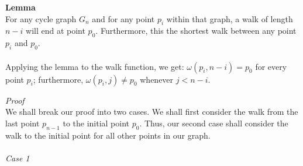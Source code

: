 \documentclass[a4paper,12pt]{article}
\begin{document}
\begin{tcolorbox}
\textbf{Lemma}\\
For any cycle graph $G_n$ and for any point $p_i$ within that graph, a walk of length $n - i$ will end at point $p_0$. Furthermore, this the shortest walk between any point $p_i$ and $p_0$.\\
\\
Applying the lemma to the walk function, we get: $\omega(p_i, n - i) = p_0$ for every point $p_i$; furthermore, $\omega(p_i, j) \neq p_0$ whenever $j < n - i$.
\end{tcolorbox}
\noindent
\textit{Proof}\\
We shall break our proof into two cases. We shall first consider the walk from the last point $p_{n-1}$ to the initial point $p_0$. Thus, our second case shall consider the walk to the initial point for all other points in our graph.\\
\\
\textit{Case 1}
\end{document}
